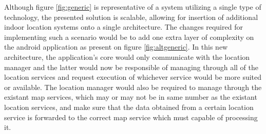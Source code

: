 Although figure \ref{fig:generic} is representative of a system utilizing a single type of technology, the presented solution is scalable, allowing for insertion of additional indoor location systems onto a single architecture. The changes required for implementing such a scenario would be to add one extra layer of complexity on the android application as present on figure \ref{fig:altgeneric}. In this new architecture, the application's core would only communicate with the location manager and the latter would now be responsible of managing through all of the location services and request execution of whichever service would be more suited or available. The location manager would also be required to manage through the existant map services, which may or may not be in same number as the existant location services, and make sure that the data obtained from a certain location service is forwarded to the correct map service which must capable of processing it.





